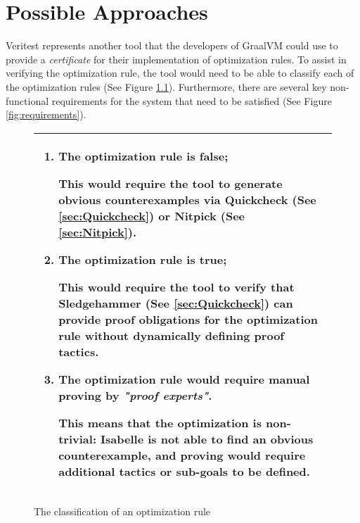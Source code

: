 \chapter{Possible Approaches \label{sec:PossibleApproaches}}

Veritest represents another tool that the developers of GraalVM could use to provide a \emph{certificate} for their implementation of optimization rules. 
To assist in verifying the optimization rule, the tool would need to be able to classify each of the optimization rules 
(See Figure \ref{fig:classification}). Furthermore, there are several key non-functional requirements for the system that need to be satisfied 
(See Figure \ref{fig:requirements}).

\begin{figure}[h]
      \begin{tabular}{|L{0.95\textwidth}|}
            \hline
            \begin{enumerate}
                  \item The optimization rule is false;
                  
                        This would require the tool to generate obvious counterexamples via Quickcheck (See \ref{sec:Quickcheck}) or Nitpick 
                        (See \ref{sec:Nitpick}).
              
                  \item The optimization rule is true;
                  
                        This would require the tool to verify that Sledgehammer (See \ref{sec:Quickcheck}) can provide proof obligations for the 
                        optimization rule \textbf{without} dynamically defining proof tactics.
              
                  \item The optimization rule would require manual proving by \emph{"proof experts"}.
                        
                        This means that the optimization is non-trivial: Isabelle is not able to find an obvious counterexample, and proving would require 
                        additional tactics or sub-goals to be defined.
            \end{enumerate} \\
            \hline
      \end{tabular}
      \caption{The classification of an optimization rule}
      \label{fig:classification}
\end{figure}


